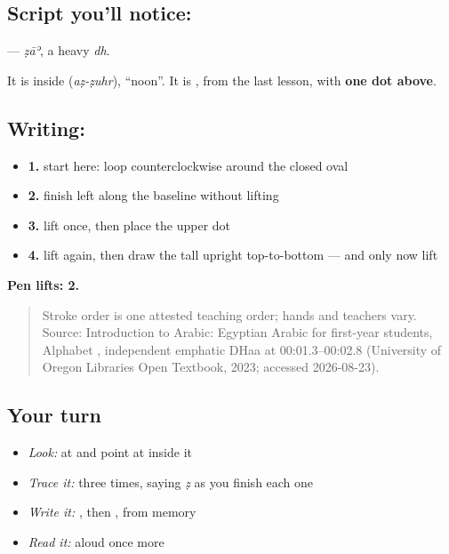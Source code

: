 \subsection*{Script you'll notice: }
\textbf{} — \emph{ẓāʾ}, a heavy \emph{dh}.

It is inside \textbf{} (\emph{aẓ-ẓuhr}), \textquotedblleft{}noon\textquotedblright{}. It is \textbf{}, from the last lesson, with \textbf{one dot above}.

\subsection*{Writing: }

\begin{itemize}
\raggedright
  \item \textbf{1.} start here: loop counterclockwise around the closed oval
  \item \textbf{2.} finish left along the baseline without lifting
  \item \textbf{3.} lift once, then place the upper dot
  \item \textbf{4.} lift again, then draw the tall upright top-to-bottom — and only now lift
\end{itemize}

\textbf{Pen lifts: 2.}

\begin{quote}
Stroke order is one attested teaching order; hands and teachers vary. Source: Introduction to Arabic: Egyptian Arabic for first-year students, Alphabet  , independent emphatic DHaa at 00:01.3–00:02.8 (University of Oregon Libraries Open Textbook, 2023; accessed 2026-08-23).
\end{quote}

\subsection*{Your turn}
\begin{itemize}
\raggedright
  \item \emph{Look:} at \textbf{} and point at  inside it
  \item \emph{Trace it:}  three times, saying \emph{ẓ} as you finish each one
  \item \emph{Write it:} , then , from memory
  \item \emph{Read it:} \textbf{} aloud once more
\end{itemize}

